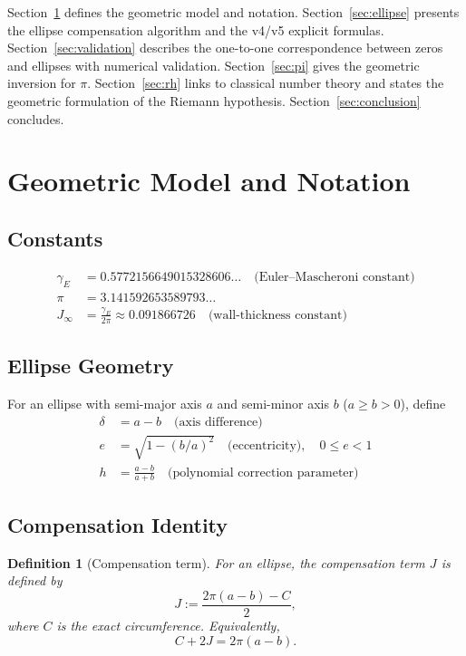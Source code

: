 \documentclass[12pt,a4paper]{article}
\newtheorem{definition}{Definition}[section]
\begin{document}
Section~\ref{sec:model} defines the geometric model and notation. Section~\ref{sec:ellipse} presents the ellipse compensation algorithm and the v4/v5 explicit formulas. Section~\ref{sec:validation} describes the one-to-one correspondence between zeros and ellipses with numerical validation. Section~\ref{sec:pi} gives the geometric inversion for $\pi$. Section~\ref{sec:rh} links to classical number theory and states the geometric formulation of the Riemann hypothesis. Section~\ref{sec:conclusion} concludes.

\section{Geometric Model and Notation}\label{sec:model}
\subsection{Constants}\label{subsec:constants}
\begin{align}
\gamma_E &= 0.5772156649015328606\ldots \quad\text{(Euler--Mascheroni constant)}\label{eq:gamma}\\
\pi &= 3.141592653589793\ldots\label{eq:pi-const}\\
J_\infty &= \frac{\gamma_E}{2\pi} \approx 0.091866726 \quad\text{(wall-thickness constant)}\label{eq:Jinf}
\end{align}

\subsection{Ellipse Geometry}\label{subsec:ellipse-geo}
For an ellipse with semi-major axis $a$ and semi-minor axis $b$ ($a\ge b>0$), define
\begin{align}
\delta &= a - b \quad\text{(axis difference)}\label{eq:delta}\\
e &= \sqrt{1 - (b/a)^2} \quad\text{(eccentricity)},\quad 0\le e<1\label{eq:eccentricity}\\
h &= \frac{a-b}{a+b} \quad\text{(polynomial correction parameter)}\label{eq:h}
\end{align}

\subsection{Compensation Identity}\label{subsec:compensation}
\begin{definition}[Compensation term]\label{def:compensation}
For an ellipse, the compensation term $J$ is defined by
\begin{equation}\label{eq:J-def}
J := \frac{2\pi(a-b)-C}{2},
\end{equation}
where $C$ is the exact circumference. Equivalently,
\begin{equation}\label{eq:compensation}
C + 2J = 2\pi(a-b).
\end{equation}
\end{definition}
\end{document}
